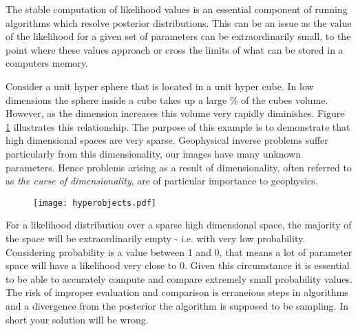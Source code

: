 \begin{tcolorbox}[enhanced jigsaw,breakable,pad at break*=1mm,title=Technical figure 3: Stable computation of likelihood values, title filled,fonttitle=\sffamily\bfseries,fontupper=\sffamily\scriptsize]
\label{tf3}

\begin{multicols}{2}

The stable computation of likelihood values is an essential component of running algorithms which resolve posterior distributions. This can be an issue as the value of the likelihood for a given set of parameters can be extraordinarily small, to the point where these values approach or cross the limits of what can be stored in a computers memory. \par

\indent Consider a unit hyper sphere that is located in a unit hyper cube. In low dimensions the sphere inside a cube takes up a large \% of the cubes volume. However, as the dimension increases this volume very rapidly diminishes. Figure \ref{hyper-objects} illustrates this relationship. The purpose of this example is to demonstrate that high dimensional spaces are very sparse. Geophysical inverse problems suffer particularly from this dimensionality, our images have many unknown parameters. Hence problems arising as a result of dimensionality, often referred to as \textit{the curse of dimensionality}, are of particular importance to geophysics. \par

\begin{figure}[H]
	\centering
	\texttt{[image: hyperobjects.pdf]}
	\label{hyper-objects}
\end{figure}

For a likelihood distribution over a sparse high dimensional space, the majority of the space will be extraordinarily empty - i.e. with very low probability. Considering probability is a value between 1 and 0, that means a lot of parameter space will have a likelihood very close to 0. Given this circumstance it is essential to be able to accurately compute and compare extremely small probability values. The risk of improper evaluation and comparison is erraneious steps in algorithms and a divergence from the posterior the algorithm is supposed to be sampling. In short your solution will be wrong. \par


\end{multicols}
\end{tcolorbox}
